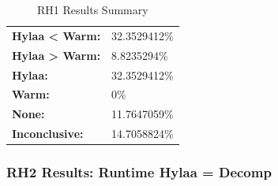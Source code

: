 \documentclass{article}\usepackage[]{graphicx}\usepackage[]{color}
\begin{document}
	\begin{table}[H]
	\centering
	\caption{RH1 Results Summary}
	\begin{tabular}{ll}
	\textbf{Hylaa \textless{} Warm:}& 32.3529412\% \\
	\textbf{Hylaa \textgreater{} Warm:}& 8.8235294\%\\
	\textbf{Hylaa:} & 32.3529412\%\\
	\textbf{Warm:} & 0\%\\
	\textbf{None:}& 11.7647059\%\\
	\textbf{Inconclusive:}& 14.7058824\%
			
	
	\end{tabular}
	\end{table}
	
	
	

	
	\subsubsection{RH2 Results: Runtime Hylaa = Decomp}
	
\end{document}

